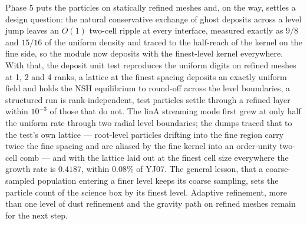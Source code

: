 \documentclass[11pt]{article}
\begin{document}
Phase 5 puts the particles on statically refined meshes and, on the way, settles a
design question: the natural conservative exchange of ghost deposits across a level jump
leaves an $O(1)$ two-cell ripple at every interface, measured exactly as $9/8$ and
$15/16$ of the uniform density and traced to the half-reach of the kernel on the fine
side, so the module now deposits with the finest-level kernel everywhere. With that, the
deposit unit test reproduces the uniform digits on refined meshes at 1, 2 and 4 ranks, a
lattice at the finest spacing deposits an exactly uniform field and holds the NSH
equilibrium to round-off across the level boundaries, a structured run is
rank-independent, test particles settle through a refined layer within $10^{-3}$ of those
that do not. The linA streaming mode first grew at only half the uniform rate through two
radial level boundaries; the dumps traced that to the test's own lattice --- root-level
particles drifting into the fine region carry twice the fine spacing and are aliased by
the fine kernel into an order-unity two-cell comb --- and with the lattice laid out at the
finest cell size everywhere the growth rate is $0.4187$, within $0.08\%$ of YJ07. The general lesson, that a
coarse-sampled population entering a finer level keeps its coarse sampling, sets the
particle count of the science box by its finest level. Adaptive refinement, more than one
level of dust refinement and the gravity path on refined meshes remain for the next step.
\end{document}
